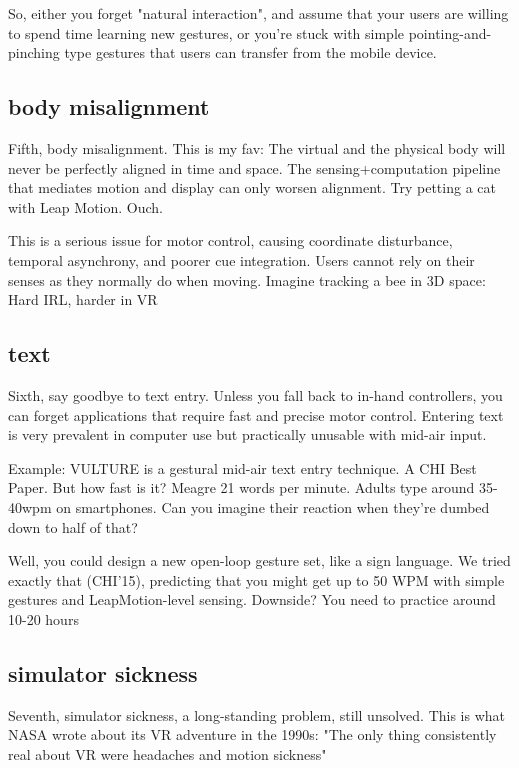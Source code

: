 So, either you forget "natural interaction", and assume that your users are willing to spend time learning new gestures, or you're stuck with simple pointing-and-pinching type gestures that users can transfer from the mobile device.



\subsection{body misalignment}
Fifth, body misalignment. This is my fav: The virtual and the physical body will never be perfectly aligned in time and space. The sensing+computation pipeline that mediates motion and display can only worsen alignment. Try petting a cat with Leap Motion. Ouch.

This is a serious issue for motor control, causing coordinate disturbance, temporal asynchrony, and poorer cue integration. Users cannot rely on their senses as they normally do when moving. Imagine tracking a bee in 3D space: Hard IRL, harder in VR


\subsection{text}
Sixth, say goodbye to text entry. Unless you fall back to in-hand controllers, you can forget applications that require fast and precise motor control. Entering text is very prevalent in computer use but practically unusable with mid-air input. 



Example: VULTURE is a gestural mid-air text entry technique. A CHI Best Paper. But how fast is it? Meagre 21 words per minute.  Adults type around 35-40wpm on smartphones. Can you imagine their reaction when they're dumbed down to half of that?

Well, you could design a new open-loop gesture set, like a sign language. We tried exactly that (CHI'15), predicting that you might get up to 50 WPM with simple gestures and LeapMotion-level sensing. Downside? You need to practice around 10-20 hours


\subsection{simulator sickness}
Seventh, simulator sickness, a long-standing problem, still unsolved. This is what NASA wrote about its VR adventure in the 1990s: "The only thing consistently real about VR were headaches and motion sickness" 

